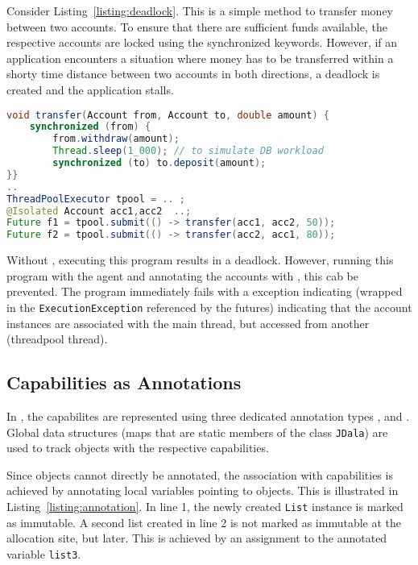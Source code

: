 \documentclass[JDala.tex]{subfiles}
\begin{document}
Consider Listing~\ref{listing:deadlock}.  This is a simple method to transfer money between two accounts. To ensure that there are sufficient funds available, the respective accounts are locked using the  synchronized keywords.  However, if an application encounters a situation where money has to be transferred within a shorty time distance between two accounts in both directions, a deadlock is created and the application stalls.

\begin{lstlisting}[language=Java, caption=Money transfer implementation prone to deadlock, label=listing:deadlock]
void transfer(Account from, Account to, double amount) {
	synchronized (from) {
		from.withdraw(amount);
		Thread.sleep(1_000); // to simulate DB workload
		synchronized (to) to.deposit(amount);
}}
.. 
ThreadPoolExecutor tpool = .. ;
@Isolated Account acc1,acc2  ..;
Future f1 = tpool.submit(() -> transfer(acc1, acc2, 50)); 
Future f2 = tpool.submit(() -> transfer(acc2, acc1, 80));
\end{lstlisting}

Without \jdala, executing this program results in a deadlock.  However, running this program with the \jdala agent and annotating the accounts with \Isolated , this cab be prevented. The program immediately fails with a \jdala exception indicating (wrapped in the \texttt{ExecutionException} referenced by the futures) indicating that the account instances are associated with the main thread, but accessed from another (threadpool thread). 

\subsection{Capabilities as Annotations}

In \jdala, the \dala capabilites are represented using three dedicated annotation types \Immutable, \Isolated and \Local.  Global data structures (maps that are static members of the class \texttt{JDala}) are used to track objects with the respective capabilities.   

Since objects cannot directly be annotated, the association with capabilities is achieved by annotating local variables pointing to objects.  This is illustrated in Listing~\ref{listing:annotation}.  In line 1, the newly created \texttt{List} instance is marked as immutable.  A second list created in line 2 is not marked as immutable at the allocation site, but later. This is achieved by an assignment to the annotated variable \texttt{list3}. 
\end{document}
